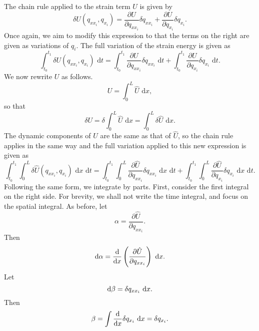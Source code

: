 The chain rule applied to the strain term $U$ is given by
\begin{equation}
\delta U(q_{xx_i},q_{x_i}) = \frac{\partial U}{\partial q_{xx_i}}\delta q_{xx_i}+\frac{\partial U}{\partial q_{x_i}}\delta q_{x_i}.
\end{equation}
Once again, we aim to modify this expression to that the terms on the right are given as variations of $q_i$.
The full variation of the strain energy is given as
\begin{equation}
\int_{t_0}^{t_1}\delta U(q_{xx_i},q_{x_i})\text{ d}t = \int_{t_0}^{t_1}\frac{\partial U}{\partial q_{xx_i}}\delta q_{xx_i}\text{ d}t+\int_{t_0}^{t_1}\frac{\partial U}{\partial q_{x_i}}\delta q_{x_i}\text{ d}t.
\end{equation}
We now rewrite $U$ as follows.
\begin{equation}
U = \int_0^L \hat{U}\text{ d}x,
\end{equation}
so that
\begin{equation}
\delta U = \delta \int_0^L\hat{U}\text{ d}x = \int_0^L\delta\hat{U}\text{ d}x.
\end{equation}
The dynamic components of $U$ are the same as that of $\hat{U}$, so the chain rule applies in the same way and the full variation applied to this new expression is given as
\begin{equation}
\int_{t_0}^{t_1}\int_0^L\delta \hat U(q_{xx_i},q_{x_i})\text{ d}x\text{ d}t = \int_{t_0}^{t_1}\int_0^L\frac{\partial \hat U}{\partial q_{xx_i}}\delta q_{xx_i}\text{ d}x\text{ d}t+\int_{t_0}^{t_1}\int_0^L\frac{\partial \hat U}{\partial q_{x_i}}\delta q_{x_i}\text{ d}x\text{ d}t.
\label{eq:strain.byparts.initial}
\end{equation}
Following the same form, we integrate by parts. First, consider the first integral on the right side. For brevity, we shall not write the time integral, and focus on the spatial integral. As before, let
\begin{equation}
\alpha = \frac{\partial \hat U}{\partial q_{xx_i}}.
\end{equation}
Then
\begin{equation}
\text d\alpha = \frac{\text d}{\text dx}\left(\frac{\partial \hat{U}}{\partial q_{xx_i}}\right)\text{ d}x.
\end{equation}
Let
\begin{equation}
\text d\beta = \delta q_{xx_i}\text{ d}x.
\end{equation}
Then 
\begin{equation}
\beta = \int \frac{\text d}{\text dx}\delta q_{x_i}\text{ d}x = \delta q_{x_i}.
\end{equation}
